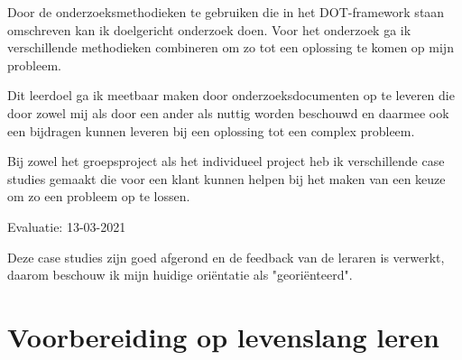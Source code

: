 Door de onderzoeksmethodieken te gebruiken die in het DOT-framework staan omschreven kan ik doelgericht onderzoek
doen.
Voor het onderzoek ga ik verschillende methodieken combineren om zo tot een oplossing te komen op mijn probleem.


Dit leerdoel ga ik meetbaar maken door onderzoeksdocumenten op te leveren die door zowel mij als door een ander als
nuttig worden beschouwd en daarmee ook een bijdragen kunnen leveren bij een oplossing tot een complex probleem.

Bij zowel het groepsproject als het individueel project heb ik verschillende case studies gemaakt die voor een klant
kunnen helpen bij het maken van een keuze om zo een probleem op te lossen.

\bigskip
Evaluatie: 13-03-2021

Deze case studies zijn goed afgerond en de feedback van de leraren is verwerkt, daarom beschouw ik mijn huidige
oriëntatie als "georiënteerd".




\section{Voorbereiding op levenslang leren}\label{sec:voorbereiding-op-levenslang-leren}

